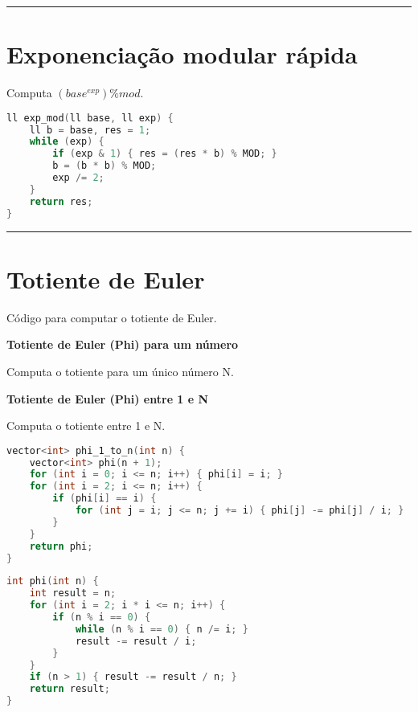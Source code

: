 \documentclass[11pt, a4paper, twoside]{book}
\begin{document}
\hfill

\rule{\textwidth}{0.4pt}

\section{Exponenciação modular rápida}



Computa $(base^{exp}) \% mod$.




\hfill

\begin{multicols}{2}
\begin{lstlisting}[language=C++]
ll exp_mod(ll base, ll exp) {
    ll b = base, res = 1;
    while (exp) {
        if (exp & 1) { res = (res * b) % MOD; }
        b = (b * b) % MOD;
        exp /= 2;
    }
    return res;
}
\end{lstlisting}
\end{multicols}

\hfill

\rule{\textwidth}{0.4pt}

\section{Totiente de Euler}



Código para computar o totiente de Euler.



\textbf{Totiente de Euler (Phi) para um número} 

Computa o totiente para um único número N.





\textbf{Totiente de Euler (Phi) entre 1 e N} 

Computa o totiente entre 1 e N.




\hfill

\begin{lstlisting}[language=C++]
vector<int> phi_1_to_n(int n) {
    vector<int> phi(n + 1);
    for (int i = 0; i <= n; i++) { phi[i] = i; }
    for (int i = 2; i <= n; i++) {
        if (phi[i] == i) {
            for (int j = i; j <= n; j += i) { phi[j] -= phi[j] / i; }
        }
    }
    return phi;
}
\end{lstlisting}

\hfill

\begin{multicols}{2}
\begin{lstlisting}[language=C++]
int phi(int n) {
    int result = n;
    for (int i = 2; i * i <= n; i++) {
        if (n % i == 0) {
            while (n % i == 0) { n /= i; }
            result -= result / i;
        }
    }
    if (n > 1) { result -= result / n; }
    return result;
}
\end{lstlisting}
\end{multicols}
\end{document}
